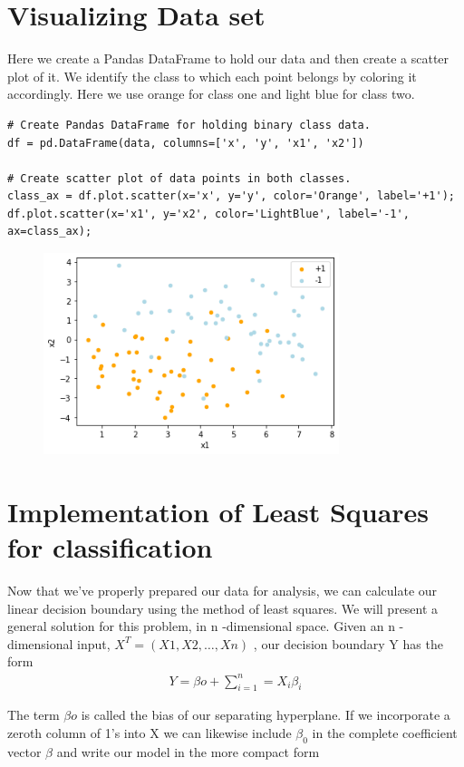\documentclass[journal,12pt,twocolumn]{IEEEtran}
\begin{document}
\section{Visualizing Data set}
Here we create a Pandas DataFrame to hold our data and then create a scatter plot of it. We identify the class to which each point belongs by coloring it accordingly. Here we use orange for class one and light blue for class two.
\begin{lstlisting}
# Create Pandas DataFrame for holding binary class data.
df = pd.DataFrame(data, columns=['x', 'y', 'x1', 'x2'])

# Create scatter plot of data points in both classes.
class_ax = df.plot.scatter(x='x', y='y', color='Orange', label='+1');
df.plot.scatter(x='x1', y='x2', color='LightBlue', label='-1', ax=class_ax);
\end{lstlisting}

\begin{figure}[!h]
\begin{center}
\includegraphics[width=3.4in]{figs/x4.png}
\end{center}
\caption{}
\label{fig:2}
\end{figure}

\section{Implementation of Least Squares for classification}
Now that we've properly prepared our data for analysis, we can calculate our linear decision boundary using the method of least squares. We will present a general solution for this problem, in  n -dimensional space. Given an  n -dimensional input,  $X^T=(X1,X2,…,Xn)$ , our decision boundary  Y  has the form
\begin{align}
    Y=\beta o+\sum_{i=1}^{n}  = X_{i}\beta_{i}
\end{align}

 
The term  $\beta o$  is called the bias of our separating hyperplane. If we incorporate a zeroth column of 1's into  X  we can likewise include  $\beta_{0}$  in the complete coefficient vector  $\beta$  and write our model in the more compact form
\end{document}
